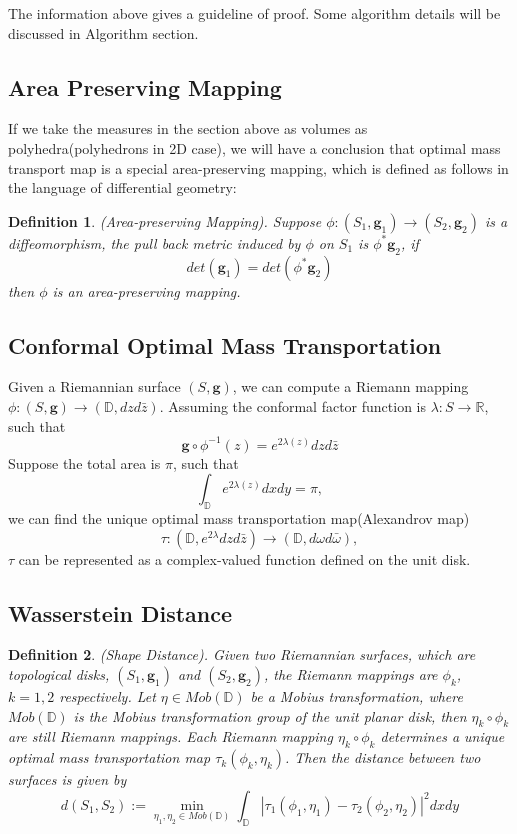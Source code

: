 \documentclass[runningheads]{llncs}
\newtheorem{mydef}{Definition}
\begin{document}
The information above gives a guideline of proof\cite{gu2013variational}. Some algorithm details will be discussed in Algorithm section.






\subsection{Area Preserving Mapping}
If we take the measures in the section above as volumes as polyhedra(polyhedrons in 2D case), we will have a conclusion that optimal mass transport map is a special area-preserving mapping, which is defined as follows in the language of differential geometry:

\begin{mydef}
(Area-preserving Mapping). Suppose $\phi:(S_1, \mathbf{g}_1)\rightarrow (S_2, \mathbf{g}_2)$ is a diffeomorphism, the pull back metric induced by $\phi$ on $S_1$ is $\phi^*\mathbf{g}_2$, if $$det(\mathbf{g}_1) = det(\phi^*\mathbf{g}_2) $$ then $\phi$ is an area-preserving mapping.
\end{mydef}


\subsection{Conformal Optimal Mass Transportation}

Given a Riemannian surface $(S,\mathbf{g})$, we can compute a Riemann mapping $\phi:(S,\mathbf{g})\rightarrow(\mathbb{D},dzd\bar{z})$. Assuming the conformal factor function is $\lambda:S\rightarrow \mathbb{R}$, such that $$\mathbf{g}\circ \phi^{-1}(z)=e^{2\lambda(z)}dzd\bar{z}$$
Suppose the total area is $\pi$, such that $$\int_\mathbb{D}e^{2\lambda(z)}dxdy=\pi,$$ we can find the unique optimal mass transportation map(Alexandrov map) $$\tau:(\mathbb{D},e^{2\lambda}dzd\bar{z})\rightarrow(\mathbb{D},d\omega d\bar{\omega}),$$ $\tau$ can be represented as a complex-valued function defined on the unit disk.



\subsection{Wasserstein Distance}

\begin{mydef}
(Shape Distance). Given two Riemannian surfaces, which are topological disks, $(S_1,\mathbf{g}_1)$ and $(S_2,\mathbf{g}_2)$, the Riemann mappings are $\phi_k$, $k=1,2$ respectively. Let $\eta\in  Mob(\mathbb{D})$ be a Mobius transformation, where $Mob(\mathbb{D})$ is the Mobius transformation group of the unit planar disk, then $\eta_k\circ \phi_k$ are still Riemann mappings. Each Riemann mapping $\eta_k\circ \phi_k$ determines a unique optimal mass transportation map $\tau_k(\phi_k,\eta_k)$. Then the distance between two surfaces is given by $$d(S_1,S_2) := \min_{\eta_1,\eta_2\in Mob(\mathbb{D})}\int_\mathbb{D}|\tau_1(\phi_1,\eta_1)-\tau_2(\phi_2,\eta_2)|^2dxdy$$
\end{mydef}
\end{document}
